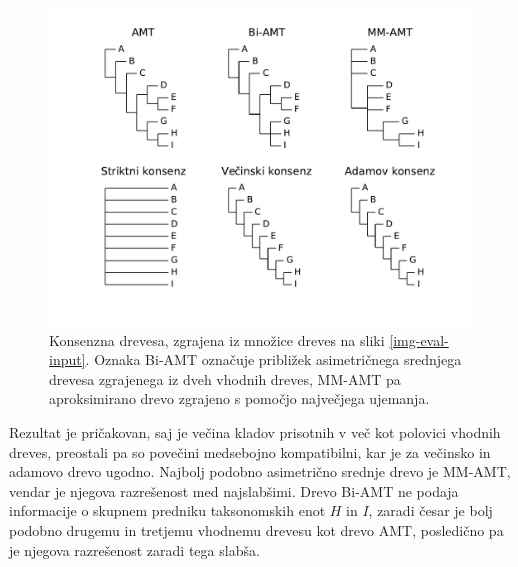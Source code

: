 \documentclass[a4paper, 12pt]{book}
\begin{document}
\begin{figure}[h!]
	\begin{center}
		\includegraphics[scale=0.55, clip=true, trim=1.5cm 1.5cm 1cm 0.8cm]{gfx/eval_gfx.pdf}
	\end{center}
	\caption{Konsenzna drevesa, zgrajena iz množice dreves na sliki \ref{img-eval-input}. Oznaka Bi-AMT označuje približek asimetričnega srednjega drevesa zgrajenega iz dveh vhodnih dreves, MM-AMT pa aproksimirano drevo zgrajeno s pomočjo največjega ujemanja.}
	\label{img-eval-result}
\end{figure}

Rezultat je pričakovan, saj je večina kladov prisotnih v več kot polovici vhodnih dreves, preostali pa so povečini medsebojno kompatibilni, kar je za večinsko in adamovo drevo ugodno. Najbolj podobno asimetrično srednje drevo je MM-AMT, vendar je njegova razrešenost med najslabšimi. Drevo Bi-AMT ne podaja informacije o skupnem predniku taksonomskih enot $H$ in $I$, zaradi česar je bolj podobno drugemu in tretjemu vhodnemu drevesu kot drevo AMT, posledično pa je njegova razrešenost zaradi tega slabša. 
\end{document}
